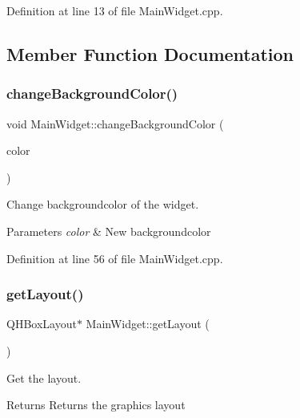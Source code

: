 Definition at line 13 of file Main\+Widget.\+cpp.



\subsection{Member Function Documentation}
\mbox{\label{classMainWidget_a72ea27c7a7054d789e7ab688cf8b0c38}} 
\subsubsection{\texorpdfstring{change\+Background\+Color()}{changeBackgroundColor()}}
{\footnotesize\ttfamily void Main\+Widget\+::change\+Background\+Color (\begin{DoxyParamCaption}\item[{const Q\+Color \&}]{color }\end{DoxyParamCaption})}



Change backgroundcolor of the widget. 


\begin{DoxyParams}{Parameters}
{\em color} & New backgroundcolor \\
\hline
\end{DoxyParams}


Definition at line 56 of file Main\+Widget.\+cpp.

\mbox{\label{classMainWidget_a639b465bb49eb31e1c09051ae047951f}} 
\subsubsection{\texorpdfstring{get\+Layout()}{getLayout()}}
{\footnotesize\ttfamily Q\+H\+Box\+Layout$\ast$ Main\+Widget\+::get\+Layout (\begin{DoxyParamCaption}{ }\end{DoxyParamCaption})\hspace{0.3cm}{\ttfamily [inline]}}



Get the layout. 

\begin{DoxyReturn}{Returns}
Returns the graphics layout 
\end{DoxyReturn}


